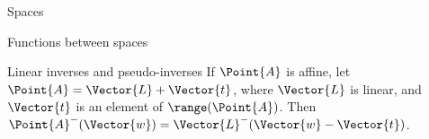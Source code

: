 \begin{plSection}{Spaces}
\begin{plSection}{Functions between spaces}
\begin{plSection}{Linear inverses and pseudo-inverses}
If $\Point{A}$ is affine,
let $\Point{A} = \Vector{L} + \Vector{t}$,
where $\Vector{L}$ is linear,
and $\Vector{t}$ is an element of $\range(\Point{A})$.
Then $\Point{A}^{-}(\Vector{w}) = \Vector{L}^{-}( \Vector{w} - \Vector{t} )$.
\end{plSection}%
\end{plSection}%
\end{plSection}%
